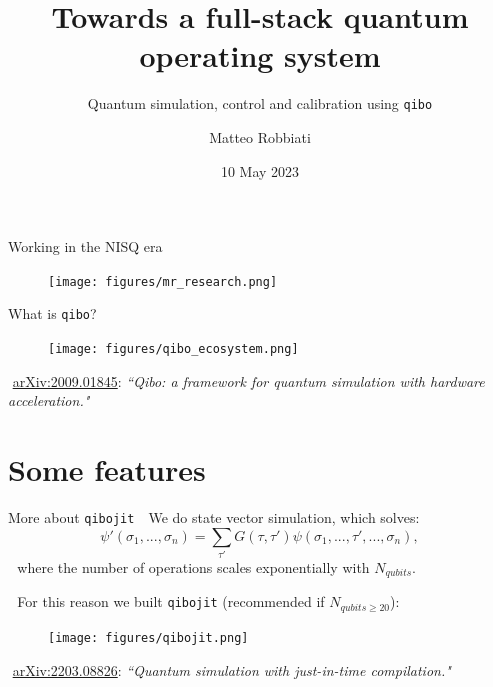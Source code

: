 \documentclass[9pt, xcolor={svgnames}, hyperref={colorlinks, linkcolor=black, citecolor=amethyst, urlcolor=amethyst}]{beamer}
\title{Towards a full-stack quantum operating system}
\subtitle{Quantum simulation, control and calibration using \texttt{qibo}}
\date{10 May 2023}
\author[Matteo Robbiati]{Matteo Robbiati}
\begin{document}
\maketitle

\begin{frame}{Working in the NISQ era}
    \begin{figure}  
    \texttt{[image: figures/mr\_research.png]}
    \end{figure}
    \vspace{-0.5cm}
\end{frame}

\begin{frame}{What is \texttt{qibo}?}
\small
    \begin{figure}  
    \texttt{[image: figures/qibo\_ecosystem.png]}
    \end{figure}
    \vfill
    \footnotesize
    \faBook\,\,\href{https://arxiv.org/abs/2009.01845}{arXiv:2009.01845}: \textit{``Qibo: a framework for quantum simulation with hardware acceleration."}\\
\end{frame}

\section{Some features}

\begin{frame}{More about \texttt{qibojit}}
\small
\faArrowCircleRight\,\, We do state vector simulation, which solves:
\begin{equation}
\psi'(\sigma_1, ..., \sigma_n) = \sum_{\tau'}G(\tau, \tau') \psi(\sigma_1, ..., 
\tau', ..., \sigma_n),
\end{equation}
\pause
\faArrowCircleRight\,\, where the number of operations scales exponentially with $N_{qubits}$.

\pause
\faArrowCircleRight\,\, For this reason we built \texttt{qibojit} (recommended if $N_{qubits \geq 20}$):
    \begin{figure}  
    \texttt{[image: figures/qibojit.png]}
    \end{figure}
    \vfill
    \footnotesize
    \faBook\,\,\href{https://arxiv.org/abs/2203.08826}{arXiv:2203.08826}: \textit{``Quantum simulation with just-in-time compilation."}\\
\end{frame}
\end{document}
